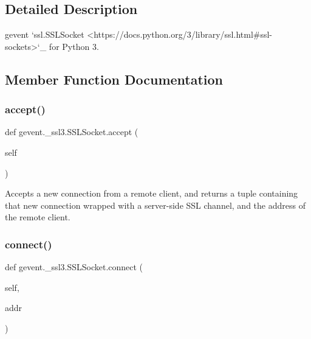 \subsection{Detailed Description}
\begin{DoxyVerb}gevent `ssl.SSLSocket <https://docs.python.org/3/library/ssl.html#ssl-sockets>`_
for Python 3.
\end{DoxyVerb}
 

\subsection{Member Function Documentation}
\mbox{\label{classgevent_1_1__ssl3_1_1_s_s_l_socket_ab0af1f088dae8fb8e2e1d94ebea1795d}} 
\subsubsection{\texorpdfstring{accept()}{accept()}}
{\footnotesize\ttfamily def gevent.\+\_\+ssl3.\+S\+S\+L\+Socket.\+accept (\begin{DoxyParamCaption}\item[{}]{self }\end{DoxyParamCaption})}

\begin{DoxyVerb}Accepts a new connection from a remote client, and returns
a tuple containing that new connection wrapped with a server-side
SSL channel, and the address of the remote client.\end{DoxyVerb}
 \mbox{\label{classgevent_1_1__ssl3_1_1_s_s_l_socket_a0e2d0c00a0cf5b917f3a2535c1d50ef4}} 
\subsubsection{\texorpdfstring{connect()}{connect()}}
{\footnotesize\ttfamily def gevent.\+\_\+ssl3.\+S\+S\+L\+Socket.\+connect (\begin{DoxyParamCaption}\item[{}]{self,  }\item[{}]{addr }\end{DoxyParamCaption})}

